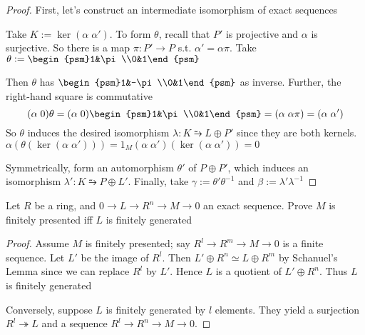 \documentclass[11pt]{article}
\begin{document}
\begin{proof}
First, let's construct an intermediate isomorphism of exact sequences
\begin{center}
\end{center}
Take \(K:=\ker(\alpha\;\alpha')\). To form \(\theta\), recall that \(P'\) is
projective and \(\alpha\) is surjective. So there is a map \(\pi:P'\to P\) s.t.
\(\alpha'=\alpha\pi\). Take \(\theta:=\begin{psm}1&\pi\\0&1\end{psm}\)

Then \(\theta\) has \(\begin{psm}1&-\pi\\0&1\end{psm}\) as inverse. Further, the
right-hand square is commutative
\begin{equation*}
(\alpha\;0)\theta=(\alpha\;0)\begin{psm}1&\pi\\0&1\end{psm}
=(\alpha\;\alpha\pi)=(\alpha\;\alpha')
\end{equation*}
So \(\theta\) induces the desired isomorphism \(\lambda:K\similarrightarrow L\oplus P'\)
since they are both kernels.
\(\alpha(\theta(\ker(\alpha\;\alpha')))=1_M(\alpha\;\alpha')(\ker(\alpha\;\alpha'))=0\)

Symmetrically, form an automorphism \(\theta'\) of \(P\oplus P'\), which
induces an isomorphism \(\lambda':K\similarrightarrow P\oplus L'\). Finally,
take \(\gamma:=\theta'\theta^{-1}\) and \(\beta:=\lambda'\lambda^{-1}\)
\end{proof}

\begin{exercise}
\label{5.24}
Let \(R\) be a ring, and \(0\to L\to R^n\to M\to 0\) an exact sequence. Prove
\(M\) is finitely presented iff \(L\) is finitely generated
\end{exercise}

\begin{proof}
Assume \(M\) is finitely presented; say \(R^l\to R^m\to M\to0\) is a finite
sequence. Let \(L'\) be the image of \(R^l\).  Then \(L'\oplus R^n\simeq
   L\oplus R^m\) by Schanuel's Lemma since we can replace \(R^l\) by \(L'\).
Hence \(L\) is a quotient of \(L'\oplus R^n\). Thus \(L\) is finitely
generated

Conversely, suppose \(L\) is finitely generated by \(l\) elements. They yield
a surjection \(R^l\twoheadrightarrow L\) and a sequence \(R^l\to R^n\to M\to0\).
\end{proof}
\end{document}
